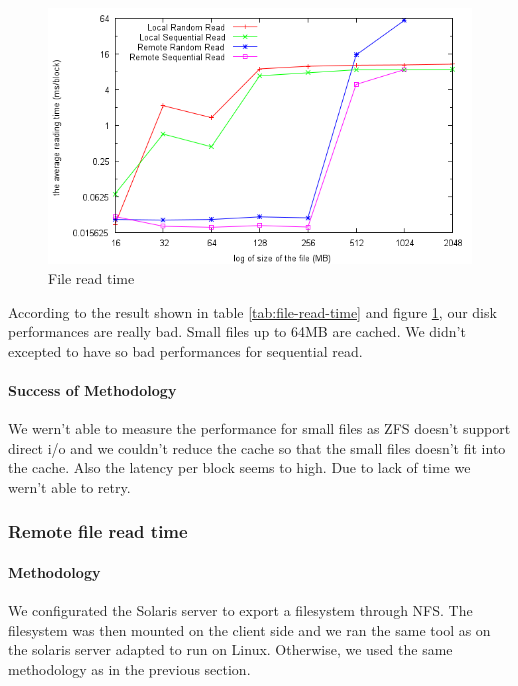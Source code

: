 \begin{figure}[h]
\begin{center}
\includegraphics[scale=0.8]{fileAccessImage}
\end{center}
\caption {File read time\label{fig:file-access}}
\end{figure}


According to the result shown in table \ref{tab:file-read-time} and figure
\ref{fig:file-access}, our disk performances are really bad.
Small files up to 64MB are cached.
We didn't excepted to have so bad performances for sequential read.

\paragraph{Success of Methodology}
We wern't able to measure the performance for small files as ZFS doesn't support
direct i/o and we couldn't reduce the cache so that the small files doesn't fit
into the cache.
Also the latency per block seems to high.
Due to lack of time we wern't able to retry.

\subsubsection{Remote file read time}
\paragraph{Methodology}
We configurated the Solaris server to export a filesystem through NFS.
The filesystem was then mounted on the client side and we ran the same tool as
on the solaris server adapted to run on Linux.
Otherwise, we used the same methodology as in the previous section.

